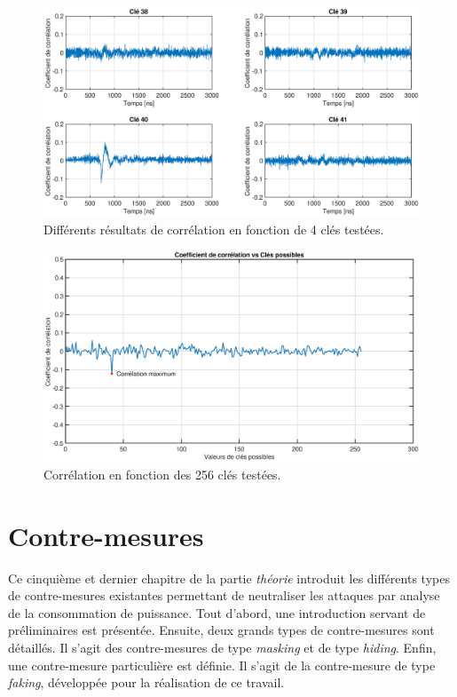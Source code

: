 \documentclass[oneside]{book}
\begin{document}
 \begin{figure}[htbp]
    \hspace{-2cm}
    \includegraphics[scale=0.4]{image/4KeysEx}
    \caption{Différents résultats de corrélation en fonction de 4 clés testées.}
    \label{fig:4KeysEx}
\end{figure}

\begin{figure}[htbp]
    \hspace{-2cm}
    \includegraphics[scale=0.4]{image/TrueKey}
    \caption{Corrélation en fonction des 256 clés testées.}
    \label{fig:TrueKey}
\end{figure}




\newpage


\chapter{Contre-mesures}
\label{chap:contremesure}

Ce cinquième et dernier chapitre de la partie \textit{théorie} introduit les différents types de contre-mesures existantes permettant de neutraliser les attaques par analyse de la consommation de puissance. Tout d'abord, une introduction servant de préliminaires est présentée. Ensuite, deux grands types de contre-mesures sont détaillés. Il s'agit des contre-mesures de type \textit{masking} et de type \textit{hiding}. Enfin, une contre-mesure particulière est définie. Il s'agit de la contre-mesure de type \textit{faking}, développée pour la réalisation de ce travail.
\end{document}
